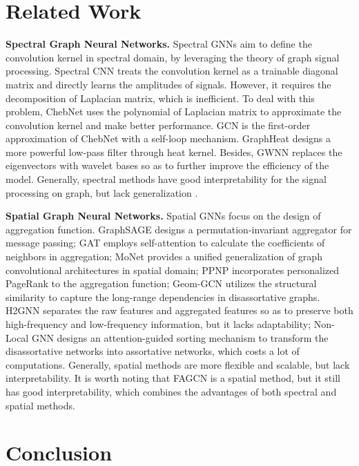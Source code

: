 \documentclass[letterpaper]{article} \usepackage{aaai21}  \usepackage{times}  \usepackage{helvet} \usepackage{courier}  \usepackage[hyphens]{url}  \usepackage{graphicx} \urlstyle{rm} \def\UrlFont{\rm}  \usepackage{natbib}  \usepackage{caption} \frenchspacing  \setlength{\pdfpagewidth}{8.5in}  \setlength{\pdfpageheight}{11in}
\begin{document}
\section{Related Work}



\textbf{Spectral Graph Neural Networks.} Spectral GNNs aim to define the convolution kernel in spectral domain, by leveraging the theory of graph signal processing. Spectral CNN \cite{SpectralCNN} treats the convolution kernel as a trainable diagonal matrix and directly learns the amplitudes of signals. However, it requires the decomposition of Laplacian matrix, which is inefficient. To deal with this problem, ChebNet \cite{ChebNet} uses the polynomial of Laplacian matrix to approximate the convolution kernel and make better performance. GCN \cite{GCN} is the first-order approximation of ChebNet with a self-loop mechanism. GraphHeat\cite{GraphHeat} designs a more powerful low-pass filter through heat kernel. Besides, GWNN \cite{GWNN} replaces the eigenvectors with wavelet bases so as to further improve the efficiency of the model. Generally, spectral methods have good interpretability for the signal processing on graph, but lack generalization \cite{GraphSAGE}.

\textbf{Spatial Graph Neural Networks.} Spatial GNNs focus on the design of aggregation function. GraphSAGE \cite{GraphSAGE} designs a permutation-invariant aggregator for message passing; GAT \cite{GAT} employs self-attention to calculate the coefficients of neighbors in aggregation; MoNet \cite{MoNet} provides a unified generalization of graph convolutional architectures in spatial domain; PPNP \cite{PPNP} incorporates personalized PageRank to the aggregation function;
Geom-GCN \cite{GeomGCN} utilizes the structural similarity to capture the long-range dependencies in disassortative graphs.
H2GNN \cite{H2GNN} separates the raw features and aggregated features so as to preserve both high-frequency and low-frequency information, but it lacks adaptability;
Non-Local GNN \cite{Non-Local} designs an attention-guided sorting mechanism to transform the disassortative networks into assortative networks, which costs a lot of computations.
Generally, spatial methods are more flexible and scalable, but lack interpretability.
It is worth noting that FAGCN is a spatial method, but it still has good interpretability, which combines the advantages of both spectral and spatial methods.

\section{Conclusion}
\end{document}
